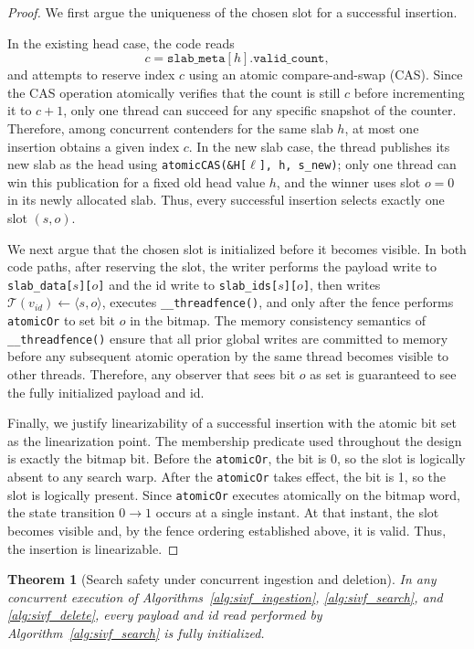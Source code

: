 \documentclass[sigconf,nonacm]{acmart}
\theoremstyle{plain}
\newtheorem{theorem}{Theorem}[section]
\theoremstyle{definition}
\theoremstyle{remark}
\begin{document}
\begin{proof}
We first argue the uniqueness of the chosen slot for a successful insertion.

In the existing head case, the code reads 
\[ c=\texttt{slab\_meta}[h].\texttt{valid\_count}, \] 
and attempts to reserve index $c$ using an atomic compare-and-swap (CAS). 
Since the CAS operation atomically verifies that the count is still $c$ before incrementing it to $c+1$, only one thread can succeed for any specific snapshot of the counter.
Therefore, among concurrent contenders for the same slab $h$, at most one insertion obtains a given index $c$. 
In the new slab case, the thread publishes its new slab as the head using \texttt{atomicCAS(\&H[$\ell$], h, s\_new)}; only one thread can win this publication for a fixed old head value $h$,
and the winner uses slot $o=0$ in its newly allocated slab. Thus, every successful insertion selects exactly one slot $(s,o)$.

We next argue that the chosen slot is initialized before it becomes visible.
In both code paths, after reserving the slot, the writer performs the payload write to \texttt{slab\_data[$s$][$o$]} and
the id write to \texttt{slab\_ids[$s$][$o$]}, then writes $\mathcal{T}(v_{id})\gets\langle s,o\rangle$, executes
\verb|__threadfence()|, and only after the fence performs \texttt{atomicOr} to set bit $o$ in the bitmap.
The memory consistency semantics of \verb|__threadfence()| ensure that all prior global writes are committed to memory before any subsequent atomic operation by the same thread becomes visible to other threads.
Therefore, any observer that sees bit $o$ as set is guaranteed to see the fully initialized payload and id.

Finally, we justify linearizability of a successful insertion with the atomic bit set as the linearization point.
The membership predicate used throughout the design is exactly the bitmap bit. Before the \texttt{atomicOr}, the bit is 0,
so the slot is logically absent to any search warp. After the \texttt{atomicOr} takes effect, the bit is 1, so the slot is logically present.
Since \texttt{atomicOr} executes atomically on the bitmap word, the state transition $0 \to 1$ occurs at a single instant.
At that instant, the slot becomes visible and, by the fence ordering established above, it is valid. Thus, the insertion is linearizable.
\end{proof}

\begin{theorem}[Search safety under concurrent ingestion and deletion]
\label{thm:search}
In any concurrent execution of Algorithms~\ref{alg:sivf_ingestion}, \ref{alg:sivf_search}, and \ref{alg:sivf_delete},
every payload and id read performed by Algorithm~\ref{alg:sivf_search} is fully initialized.
\end{theorem}
\end{document}
